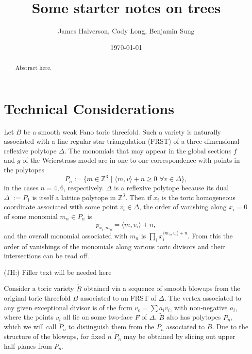 \documentclass[aps,prl,twocolumn, superscriptaddress,groupedaddress,nofootinbib]{revtex4}
\newcommand{\bZ}{\mathbb{Z}}
\newcommand{\jh}[1]{{\color{red}(JH:) #1}}
\begin{document}
\title{Some starter notes on trees}
\author{James Halverson, Cody Long, Benjamin Sung}

\date{\today}

\begin{abstract}
Abstract here.
\end{abstract}

\maketitle

\section{Technical Considerations}

Let $B$ be a smooth weak Fano toric threefold. Such a variety is naturally
associated with a  fine regular star triangulation (FRST) of a three-dimensional reflexive polytope $\Delta$.
The monomials that may appear in the global sections $f$ and $g$ of the Weierstrass model are 
in one-to-one correspondence with points in the polytopes
\begin{equation} 
P_n := \{m \in \bZ^3 \,\,|\,\, \langle m,v\rangle + n \geq 0 \,\, \forall v \in \Delta \},
\end{equation}
in the cases $n=4,6$, respectively. $\Delta$ is a reflexive polytope because its dual
$\Delta^\circ:=P_1$ is itself a lattice polytope in $\bZ^3$. Then if $x_i$ is the toric
homogeneous coordinate associated with some point $v_i\in \Delta$, the order of vanishing
along $x_i=0$ of some monomial $m_n\in P_n$ is 
\begin{equation}
p_{x_i,m_n} = \langle m,v_i\rangle +n,
\end{equation}
and the overall monomial associated with $m_n$ is $\prod_i x_i^{\langle m_n, v_i\rangle+n}$.
From this the order of vanishings of the monomials along various toric divisors and their intersections
can be read off.

\jh{Filler text will be needed here}

Consider a toric variety $\tilde B$ obtained via a sequence of smooth blowups from the original toric threefold $B$ associated to an FRST of $\Delta$. The vertex associated to any given exceptional divisor is of the form $v_e=\sum a_i v_i$, with non-negative $a_i$, where the points $v_i$ all
lie on some two-face $F$ of $\Delta$. $\tilde B$ also has polytopes $P_n$, which we will call $\tilde P_n$
to distinguish them from the $P_n$ associated to $B$.  Due to the structure of the blowups, for fixed
$n$ $\tilde P_n$ may be obtained by slicing out upper half planes from $P_n$.
\end{document}
